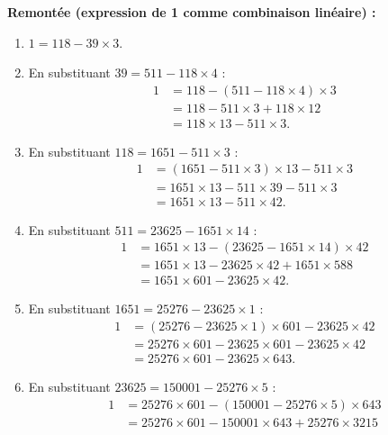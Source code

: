 \documentclass[12pt,a4paper]{article}
\begin{document}
\medskip
\textbf{Remontée (expression de 1 comme combinaison linéaire) :}

\begin{enumerate}
    \item $1 = 118 - 39 \times 3$.
    \item En substituant $39 = 511 - 118 \times 4$ :
          \[
          \begin{aligned}
          1 &= 118 - (511 - 118 \times 4) \times 3 \\
            &= 118 - 511 \times 3 + 118 \times 12 \\
            &= 118 \times 13 - 511 \times 3.
          \end{aligned}
          \]
    \item En substituant $118 = 1651 - 511 \times 3$ :
          \[
          \begin{aligned}
          1 &= (1651 - 511 \times 3) \times 13 - 511 \times 3 \\
            &= 1651 \times 13 - 511 \times 39 - 511 \times 3 \\
            &= 1651 \times 13 - 511 \times 42.
          \end{aligned}
          \]
    \item En substituant $511 = 23625 - 1651 \times 14$ :
          \[
          \begin{aligned}
          1 &= 1651 \times 13 - (23625 - 1651 \times 14) \times 42 \\
            &= 1651 \times 13 - 23625 \times 42 + 1651 \times 588 \\
            &= 1651 \times 601 - 23625 \times 42.
          \end{aligned}
          \]
    \item En substituant $1651 = 25276 - 23625 \times 1$ :
          \[
          \begin{aligned}
          1 &= (25276 - 23625 \times 1) \times 601 - 23625 \times 42 \\
            &= 25276 \times 601 - 23625 \times 601 - 23625 \times 42 \\
            &= 25276 \times 601 - 23625 \times 643.
          \end{aligned}
          \]
    \item En substituant $23625 = 150001 - 25276 \times 5$ :
          \[
          \begin{aligned}
          1 &= 25276 \times 601 - (150001 - 25276 \times 5) \times 643 \\
            &= 25276 \times 601 - 150001 \times 643 + 25276 \times 3215 \\

\end{aligned}\]
\end{enumerate}
\end{document}
